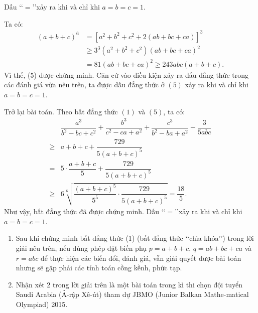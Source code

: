 \begin{bt}
{\begin{itemize}
Dấu \lq\lq $=$\rq\rq xảy ra khi và chỉ khi $a = b = c=1$.\\
\begin{cm}  Ta có:
{\allowdisplaybreaks
\begin{align*}
(a + b + c)^6 &= \left[ a^2 + b^2 + c^2 + 2(ab + bc + ca) \right]^3\\
&\ge 3^3\left( a^2 + b^2 + c^2 \right)( ab + bc + ca)^2 \\
&= 81(ab + bc + ca)^2 \ge 243abc(a + b + c).
\end{align*}}Vì thế, (5) được chứng minh.
Căn cứ vào điều kiện xảy ra dấu đẳng thức trong các đánh giá vừa nêu trên, ta được dấu đẳng thức ở $(5)$ xảy ra khi và chỉ khi $a = b = c=1$.
\end{cm}
\end{itemize}
Trở lại bài toán.
Theo bất đẳng thức $(1)$ và $(5)$, ta có:
{\allowdisplaybreaks
\begin{align*}
&\dfrac{a^3}{b^2 - bc + c^2} + \dfrac{b^3}{c^2 - ca + a^2} + \dfrac{c^3}{b^2 - ba + a^2} + \dfrac{3}{5abc}\\
\ge& a + b + c + \dfrac{729}{5(a + b + c)^5}\\
=& 5\cdot\dfrac{a + b + c}{5} + \dfrac{729}{5(a + b + c)^5}\\
\ge& 6\sqrt[6]{\dfrac{( a + b + c)^5}{5^5}\cdot\dfrac{729}{5(a + b + c)^5}} = \dfrac{18}{5}.
\end{align*}}
Như vậy, bất đẳng thức đã được chứng minh. Dấu \lq\lq $=$\rq\rq xảy ra khi và chỉ khi $a = b = c=1$.
\begin{nx}\hfill
\begin{enumerate}[1.]
 \item Sau khi chứng minh bất đẳng thức (1) (bất đẳng thức \lq\lq chìa khóa\rq\rq) trong lời giải nêu trên, nếu dùng phép đặt biến phụ $p=a+b+c$, $q=ab+bc+ca$ và $r=abc$ để thực hiện các biến đổi, đánh giá, vẫn giải quyết được bài toán nhưng sẽ gặp phải các tính toán cồng kềnh, phức tạp.
\item  Nhận xét 2 trong lời giải trên là một bài toán trong kì thi chọn đội tuyển Saudi Arabia (Ả-rập Xê-út) tham dự JBMO (Junior Balkan Mathe-matical Olympiad) 2015.
\end{enumerate}
\end{nx}
}
\end{bt}


